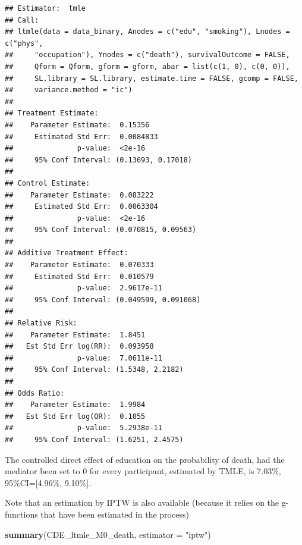 \documentclass[
]{book}
\newenvironment{Shaded}{\begin{snugshade}}{\end{snugshade}}
\newcommand{\AttributeTok}[1]{\textcolor[rgb]{0.13,0.29,0.53}{#1}}
\newcommand{\FunctionTok}[1]{\textcolor[rgb]{0.13,0.29,0.53}{\textbf{#1}}}
\newcommand{\NormalTok}[1]{#1}
\newcommand{\StringTok}[1]{\textcolor[rgb]{0.31,0.60,0.02}{#1}}
\begin{document}
\begin{verbatim}
## Estimator:  tmle 
## Call:
## ltmle(data = data_binary, Anodes = c("edu", "smoking"), Lnodes = c("phys", 
##     "occupation"), Ynodes = c("death"), survivalOutcome = FALSE, 
##     Qform = Qform, gform = gform, abar = list(c(1, 0), c(0, 0)), 
##     SL.library = SL.library, estimate.time = FALSE, gcomp = FALSE, 
##     variance.method = "ic")
## 
## Treatment Estimate:
##    Parameter Estimate:  0.15356 
##     Estimated Std Err:  0.0084833 
##               p-value:  <2e-16 
##     95% Conf Interval: (0.13693, 0.17018) 
## 
## Control Estimate:
##    Parameter Estimate:  0.083222 
##     Estimated Std Err:  0.0063304 
##               p-value:  <2e-16 
##     95% Conf Interval: (0.070815, 0.09563) 
## 
## Additive Treatment Effect:
##    Parameter Estimate:  0.070333 
##     Estimated Std Err:  0.010579 
##               p-value:  2.9617e-11 
##     95% Conf Interval: (0.049599, 0.091068) 
## 
## Relative Risk:
##    Parameter Estimate:  1.8451 
##   Est Std Err log(RR):  0.093958 
##               p-value:  7.0611e-11 
##     95% Conf Interval: (1.5348, 2.2182) 
## 
## Odds Ratio:
##    Parameter Estimate:  1.9984 
##   Est Std Err log(OR):  0.1055 
##               p-value:  5.2938e-11 
##     95% Conf Interval: (1.6251, 2.4575)
\end{verbatim}

The controlled direct effect of education on the probability of death, had the mediator been set to 0 for every participant, estimated by TMLE, is 7.03\%, 95\%CI={[}4.96\%, 9.10\%{]}.

Note that an estimation by IPTW is also available (because it relies on the g-functions that have been estimated in the process)

\begin{Shaded}
\begin{Highlighting}[]
\FunctionTok{summary}\NormalTok{(CDE\_ltmle\_M0\_death, }\AttributeTok{estimator =} \StringTok{"iptw"}\NormalTok{)}
\end{Highlighting}
\end{Shaded}
\end{document}
